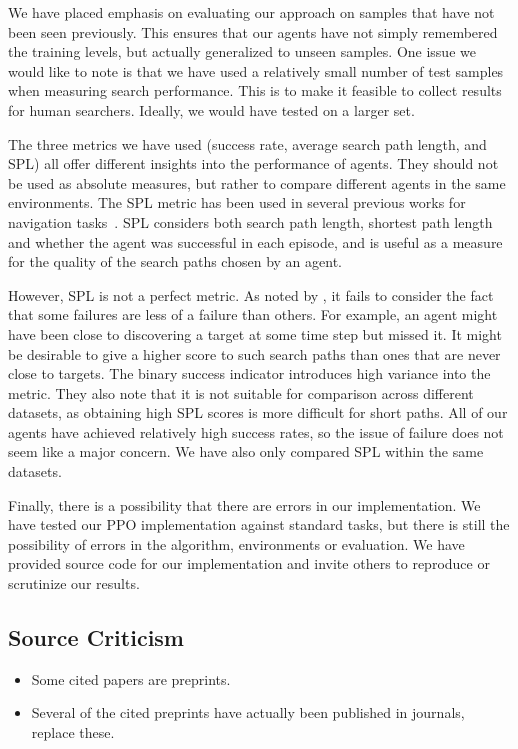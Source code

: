 We have placed emphasis on evaluating our approach on samples that have not been seen previously.
This ensures that our agents have not simply remembered the training levels, but actually generalized to unseen samples.
One issue we would like to note is that we have used a relatively small number of test samples when measuring search performance.
This is to make it feasible to collect results for human searchers.
Ideally, we would have tested on a larger set.

The three metrics we have used (success rate, average search path length, and SPL) all offer different insights into the performance of agents.
They should not be used as absolute measures, but rather to compare different agents in the same environments.
The SPL metric has been used in several previous works for navigation tasks~\cite{anderson_evaluation_2018,yang_visual_2018}.
SPL considers both search path length, shortest path length and whether the agent was successful in each episode,
and is useful as a measure for the quality of the search paths chosen by an agent.

However, SPL is not a perfect metric. As noted by \cite{batra_objectnav_2020}, it fails to consider the fact that some failures are less of a failure than others.
For example, an agent might have been close to discovering a target at some time step but missed it.
It might be desirable to give a higher score to such search paths than ones that are never close to targets.
The binary success indicator introduces high variance into the metric.
They also note that it is not suitable for comparison across different datasets, as obtaining high SPL scores is more difficult for short paths.
All of our agents have achieved relatively high success rates, so the issue of failure does not seem like a major concern.
We have also only compared SPL within the same datasets.

Finally, there is a possibility that there are errors in our implementation.
We have tested our PPO implementation against standard tasks, but there is still the possibility of errors in the algorithm, environments or evaluation.
We have provided source code for our implementation and invite others to reproduce or scrutinize our results.

\subsection{Source Criticism}

\begin{itemize}
    \item Some cited papers are preprints.
    \item Several of the cited preprints have actually been published in journals, replace these.
\end{itemize}

